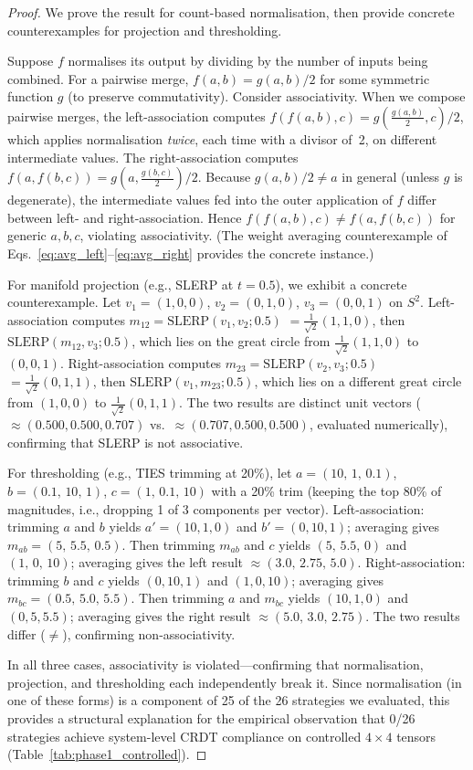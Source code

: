 \documentclass[10pt,letterpaper]{article}
\begin{document}
\begin{proof}
We prove the result for count-based normalisation, then provide concrete counterexamples for projection and thresholding.

Suppose $f$ normalises its output by dividing by the number of inputs being combined.
For a pairwise merge, $f(a,b) = g(a,b)/2$ for some symmetric function $g$ (to preserve commutativity).
Consider associativity.
When we compose pairwise merges, the left-association computes $f(f(a,b),c) = g\!\left(\frac{g(a,b)}{2}, c\right)/2$, which applies normalisation \emph{twice}, each time with a divisor of~2, on different intermediate values.
The right-association computes $f(a,f(b,c)) = g\!\left(a, \frac{g(b,c)}{2}\right)/2$.
Because $g(a,b)/2 \neq a$ in general (unless $g$ is degenerate), the intermediate values fed into the outer application of $f$ differ between left- and right-association.
Hence $f(f(a,b),c) \neq f(a,f(b,c))$ for generic $a,b,c$, violating associativity.  (The weight averaging counterexample of Eqs.~\ref{eq:avg_left}--\ref{eq:avg_right} provides the concrete instance.)

For manifold projection (e.g., SLERP at $t=0.5$), we exhibit a concrete counterexample.
Let $v_1 = (1,0,0)$, $v_2 = (0,1,0)$, $v_3 = (0,0,1)$ on $S^2$.
Left-association computes $m_{12} = \mathrm{SLERP}(v_1, v_2; 0.5)$ $= \frac{1}{\sqrt{2}}(1,1,0)$, then $\mathrm{SLERP}(m_{12}, v_3; 0.5)$, which lies on the great circle from $\frac{1}{\sqrt{2}}(1,1,0)$ to $(0,0,1)$.
Right-association computes $m_{23} = \mathrm{SLERP}(v_2, v_3; 0.5)$ $= \frac{1}{\sqrt{2}}(0,1,1)$, then $\mathrm{SLERP}(v_1, m_{23}; 0.5)$, which lies on a different great circle from $(1,0,0)$ to $\frac{1}{\sqrt{2}}(0,1,1)$.
The two results are distinct unit vectors ($\approx(0.500, 0.500, 0.707)$ vs.\ $\approx(0.707, 0.500, 0.500)$, evaluated numerically), confirming that SLERP is not associative.

For thresholding (e.g., TIES trimming at 20\%), let $a = (10,\, 1,\, 0.1)$, $b = (0.1,\, 10,\, 1)$, $c = (1,\, 0.1,\, 10)$ with a 20\% trim (keeping the top 80\% of magnitudes, i.e., dropping 1 of 3 components per vector).
Left-association: trimming $a$ and $b$ yields $a' = (10, 1, 0)$ and $b' = (0, 10, 1)$; averaging gives $m_{ab} = (5,\, 5.5,\, 0.5)$.
Then trimming $m_{ab}$ and $c$ yields $(5,\, 5.5,\, 0)$ and $(1,\, 0,\, 10)$; averaging gives the left result $\approx (3.0,\, 2.75,\, 5.0)$.
Right-association: trimming $b$ and $c$ yields $(0, 10, 1)$ and $(1, 0, 10)$; averaging gives $m_{bc} = (0.5,\, 5.0,\, 5.5)$.
Then trimming $a$ and $m_{bc}$ yields $(10, 1, 0)$ and $(0, 5, 5.5)$; averaging gives the right result $\approx (5.0,\, 3.0,\, 2.75)$.
The two results differ ($\neq$), confirming non-associativity.

In all three cases, associativity is violated---confirming that normalisation, projection, and thresholding each independently break it.
Since normalisation (in one of these forms) is a component of 25 of the 26 strategies we evaluated, this provides a structural explanation for the empirical observation that 0/26 strategies achieve system-level CRDT compliance on controlled $4\times 4$ tensors (Table~\ref{tab:phase1_controlled}).
\end{proof}
\end{document}
